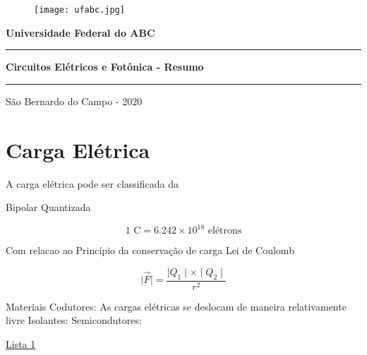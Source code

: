 \documentclass[a4paper,12pt,onecolumn]{article}
\numberwithin{equation}{section}
\numberwithin{figure}{section}
\begin{document}
\begin{figure}[hbtp]
\centering
\texttt{[image: ufabc.jpg]}
\end{figure}

\begin{center}
\textbf{Universidade Federal do ABC}
\end{center}

\vspace{0.5cm}

\hrule
\begin{center}
\textbf{Circuitos Elétricos e Fotônica - Resumo}
\end{center}
\hrule


\vspace{8cm}

\begin{center}
São Bernardo do Campo - 2020
\end{center}

\newpage

\begin{abstract}

\end{abstract}


\newpage
\begin{center}
\tableofcontents
\end{center}

\newpage
\section{Carga Elétrica}
A carga elétrica pode ser classificada da

Bipolar
Quantizada

\begin{equation}
1 \text{ C} = 6.242 \times 10^{18} \text{ elétrons}
\end{equation}{}

Com relacao ao Princípio da conservação de carga Lei de Coulomb

\begin{equation}
\mid \vec{F} \mid = \dfrac{\mid Q_{1} \mid \times \mid Q_{2} \mid}{r^2}
\end{equation}{}

Materiais
Codutores: As cargas elétricas se deslocam de maneira relativamente livre
Isolantes:
Semicondutores:

\begin{center}
  \href{www.google.com}{Lista 1}
\end{center}
\end{document}
